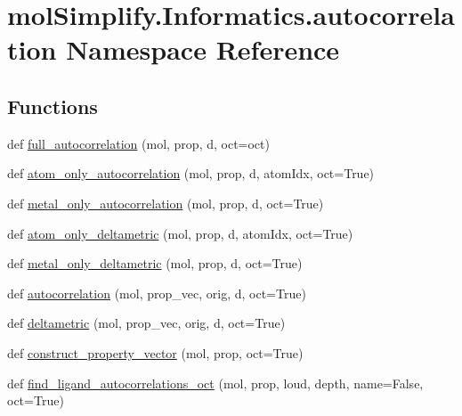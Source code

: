 \hypertarget{namespacemolSimplify_1_1Informatics_1_1autocorrelation}{}\section{mol\+Simplify.\+Informatics.\+autocorrelation Namespace Reference}
\label{namespacemolSimplify_1_1Informatics_1_1autocorrelation}
\subsection*{Functions}
\begin{DoxyCompactItemize}
\item 
def \hyperlink{namespacemolSimplify_1_1Informatics_1_1autocorrelation_a4d4d5475abc8e3d06214bb02184f0f48}{full\+\_\+autocorrelation} (mol, prop, d, oct=oct)
\item 
def \hyperlink{namespacemolSimplify_1_1Informatics_1_1autocorrelation_a8192d53b8f634b3a593fa3ea68075a17}{atom\+\_\+only\+\_\+autocorrelation} (mol, prop, d, atom\+Idx, oct=True)
\item 
def \hyperlink{namespacemolSimplify_1_1Informatics_1_1autocorrelation_a9a844293792723102720f3cce6a06fce}{metal\+\_\+only\+\_\+autocorrelation} (mol, prop, d, oct=True)
\item 
def \hyperlink{namespacemolSimplify_1_1Informatics_1_1autocorrelation_a232eb456325d4d1f1a5d0a09b2b39049}{atom\+\_\+only\+\_\+deltametric} (mol, prop, d, atom\+Idx, oct=True)
\item 
def \hyperlink{namespacemolSimplify_1_1Informatics_1_1autocorrelation_abac4d15d547a61a74a138731299ec2fd}{metal\+\_\+only\+\_\+deltametric} (mol, prop, d, oct=True)
\item 
def \hyperlink{namespacemolSimplify_1_1Informatics_1_1autocorrelation_afb2851eae0fb43e879dda8f6a8156474}{autocorrelation} (mol, prop\+\_\+vec, orig, d, oct=True)
\item 
def \hyperlink{namespacemolSimplify_1_1Informatics_1_1autocorrelation_a351621ccecd9fc04206081cb22e12dfd}{deltametric} (mol, prop\+\_\+vec, orig, d, oct=True)
\item 
def \hyperlink{namespacemolSimplify_1_1Informatics_1_1autocorrelation_a39c0b0b2a4c0af36e6bc972b31749d8c}{construct\+\_\+property\+\_\+vector} (mol, prop, oct=True)
\item 
def \hyperlink{namespacemolSimplify_1_1Informatics_1_1autocorrelation_a96ebcf9906e8f54bcc36bd49b97b6c95}{find\+\_\+ligand\+\_\+autocorrelations\+\_\+oct} (mol, prop, loud, depth, name=False, oct=True)

\end{DoxyCompactItemize}

